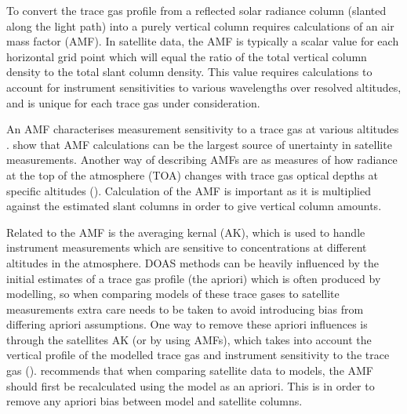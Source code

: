       To convert the trace gas profile from a reflected solar radiance column (slanted along the light path) into a purely vertical column requires calculations of an air mass factor (AMF).
      In satellite data, the AMF is typically a scalar value for each horizontal grid point which will equal the ratio of the total vertical column density to the total slant column density.
      This value requires calculations to account for instrument sensitivities to various wavelengths over resolved altitudes, and is unique for each trace gas under consideration.
      
      An AMF characterises measurement sensitivity to a trace gas at various altitudes \cite[e.g.]{Palmer2001}.
      \cite{Lorente2017} show that AMF calculations can be the largest source of unertainty in satellite measurements.
      Another way of describing AMFs are as measures of how radiance at the top of the atmosphere (TOA) changes with trace gas optical depths at specific altitudes (\cite{Lorente2017}).
      Calculation of the AMF is important as it is multiplied against the estimated slant columns in order to give vertical column amounts.
      
      Related to the AMF is the averaging kernal (AK), which is used to handle instrument measurements which are sensitive to concentrations at different altitudes in the atmosphere.
      DOAS methods can be heavily influenced by the initial estimates of a trace gas profile (the apriori) which is often produced by modelling, so when comparing models of these trace gases to satellite measurements extra care needs to be taken to avoid introducing bias from differing apriori assumptions.
      One way to remove these apriori influences is through the satellites AK (or by using AMFs), which takes into account the vertical profile of the modelled trace gas and instrument sensitivity to the trace gas (\cite{Eskes2003, Palmer2001}).
      \cite{Lamsal2014} recommends that when comparing satellite data to models, the AMF should first be recalculated using the model as an apriori.
      This is in order to remove any apriori bias between model and satellite columns.
      
